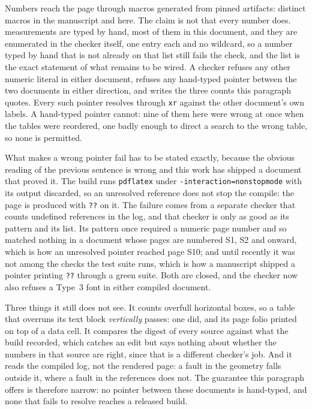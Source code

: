 \documentclass[journal=jcisd8,manuscript=suppinfo,layout=onecolumn]{achemso}
\begin{document}
Numbers reach the page through macros generated from pinned artifacts: \numProvMacrosbody{}
distinct macros in the manuscript and \numProvMacrossi{} here. The claim is not that every
number does. \numProvHandtyped{} measurements are typed by hand, most of them in this document,
and they are enumerated in the checker itself, one entry each and no wildcard, so a number
typed by hand that is not already on that list still fails the check, and the list is the exact
statement of what remains to be wired. A checker refuses any other numeric literal in either
document, refuses any hand-typed pointer between the two documents in either direction, and
writes the three counts this paragraph quotes. Every such pointer resolves through
\texttt{xr} against the other document's own labels. A hand-typed pointer cannot: nine of them here
were wrong at once when the tables were reordered, one badly enough to direct a search to the
wrong table, so none is permitted.

What makes a wrong pointer fail has to be stated exactly, because the obvious reading of the
previous sentence is wrong and this work has shipped a document that proved it. The build runs
\texttt{pdflatex} under \texttt{-interaction=nonstopmode} with its output discarded, so an
unresolved reference does not stop the compile: the page is produced with \texttt{??} on it. The
failure comes from a separate checker that counts undefined references in the log, and that checker
is only as good as its pattern and its list. Its pattern once required a numeric page number and so
matched nothing in a document whose pages are numbered S1, S2 and onward, which is how an
unresolved pointer reached page S10; and until recently it was not among the checks the test suite
runs, which is how a manuscript shipped a pointer printing \texttt{??} through a green suite. Both
are closed, and the checker now also refuses a Type~3 font in either compiled document.

Three things it still does not see. It counts overfull horizontal boxes, so a table that overruns
its text block \emph{vertically} passes: one did, and its page folio printed on top of a data cell.
It compares the digest of every source against what the build recorded, which catches an edit but
says nothing about whether the numbers in that source are right, since that is a different
checker's job. And it reads the compiled log, not the rendered page: a fault
in the geometry falls outside it, where a fault in the references does not. The guarantee this paragraph
offers is therefore narrow: no pointer between these documents is hand-typed, and none that fails
to resolve reaches a released build.
\end{document}
